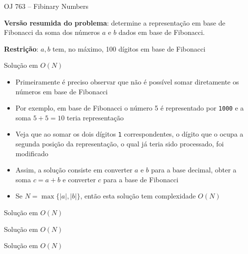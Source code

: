 \begin{frame}[fragile]{OJ 763 -- Fibinary Numbers}

    \textbf{Versão resumida do problema}: determine a representação em base de Fibonacci da soma
        dos números $a$ e $b$ dados em base de Fibonacci.
            
    \vspace{0.1in}

    \textbf{Restrição}: $a, b$ tem, no máximo, 100 dígitos em base de Fibonacci
\end{frame}

\begin{frame}[fragile]{Solução em $O(N)$}

    \begin{itemize}
        \item Primeiramente é preciso observar que não é possível somar diretamente os números em
            base de Fibonacci

        \item Por exemplo, em base de Fibonacci o número 5 é representado por \texttt{1000} e a
            soma $5 + 5 = 10$ teria representação 

        \item Veja que ao somar os dois dígitos \texttt{1} correspondentes, o dígito que o ocupa
            a segunda posição da representação, o qual já teria sido processado, foi modificado

        \item Assim, a solução consiste em converter $a$ e $b$ para a base decimal, obter a soma
            $c = a + b$ e converter $c$ para a base de Fibonacci

        \item Se $N = \max\{|a|, |b|\}$, então esta solução tem complexidade $O(N)$
    \end{itemize}

\end{frame}

\begin{frame}[fragile]{Solução em $O(N)$}
\end{frame}

\begin{frame}[fragile]{Solução em $O(N)$}
\end{frame}

\begin{frame}[fragile]{Solução em $O(N)$}
\end{frame}
